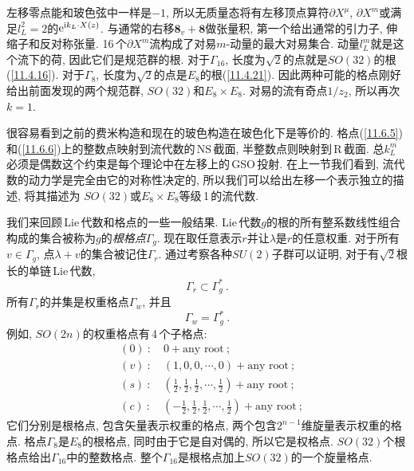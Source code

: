 左移零点能和玻色弦中一样是$ -1$, 所以无质量态将有左移顶点算符$ \partial X^{\mu}$, $\partial X^{m} $或满足$ l_{L}^{2}=2 $的$ \mathrm{e}^{\mathrm{i} k_{L}\cdot X(z)}$.  与通常的右移$ \mathbf{8}_{v}+\mathbf{8} $做张量积, 第一个给出通常的引力子, 伸缩子和反对称张量. 16\,个$\partial X^{m} $流构成了对易$ m $-动量的最大对易集合. 动量$ l_{L}^{m} $就是这个流下的荷, 因此它们是规范群的根. 对于$ \Gamma_{16}$, 长度为$ \sqrt{2} $的点就是$ SO(32) $的根(\ref{11.4.16}). 对于$ \Gamma_{8}$, 长度为$ \sqrt{2} $的点是$ E_{8} $的根(\ref{11.4.21}). 因此两种可能的格点刚好给出前面发现的两个规范群, $SO(32) $和$ E_{8}\times E_{8}$. 对易的流有奇点$ 1/z_{2}$, 所以再次$ k=1$.

很容易看到之前的费米构造和现在的玻色构造在玻色化下是等价的. 格点(\ref{11.6.5})和(\ref{11.6.6})上的整数点映射到流代数的\,NS\,截面, 半整数点则映射到\,R\,截面. 总$ k_{L}^{m} $必须是偶数这个约束是每个理论中在左移上的\,GSO\,投射. 在上一节我们看到, 流代数的动力学是完全由它的对称性决定的, 所以我们可以给出左移一个表示独立的描述, 将其描述为 $SO(32) $或$ E_{8}\times E_{8} $等级\,1\,的流代数.

我们来回顾\,Lie\,代数和格点的一些一般结果. Lie\,代数$ g $的根的所有整系数线性组合构成的集合被称为$ g $的{\emph{根格点}}$ \Gamma_{g}$. 现在取任意表示$ r $并让$ \lambda $是$ r $的任意权重. 对于所有$ v\in\Gamma_{g}$, 点$ \lambda+v $的集合被记住$ \Gamma_{r}$. 通过考察各种$ SU(2) $子群可以证明, 对于有$ \sqrt{2} $根长的单链\,Lie\,代数,
\begin{equation}
    \Gamma_{r} \subset \Gamma_{g}^{\ast} \:. \label{11.6.7}
\end{equation}
所有$ \Gamma_{r} $的并集是权重格点$ \Gamma_{w}$, 并且
\begin{equation}
    \Gamma_{w}=\Gamma_{g}^{\ast} \:.
\end{equation}
例如, $SO(2n) $的权重格点有\,4\,个子格点:
\begin{subequations}
\begin{align}
     &(0)\::\quad 0+\text{any root}\:; \label{11.6.9a} \\
     &(v)\::\quad (1,0,0,\cdots,0)+\text{any root}\:; \label{11.6.9b} \\
     &(s)\::\quad (\tfrac{1}{2},\tfrac{1}{2},\tfrac{1}{2},\cdots,\tfrac{1}{2})+\text{any root}\:; \label{11.6.9c} \\
     &(c)\::\quad (-\tfrac{1}{2},\tfrac{1}{2},\tfrac{1}{2},\cdots,\tfrac{1}{2})+\text{any root}\:; \label{11.6.9d} 
\end{align} \label{11.6.9}
\end{subequations}
它们分别是根格点, 包含矢量表示权重的格点, 两个包含$ 2^{n-1} $维旋量表示权重的格点.  格点$ \Gamma_{8} $是$ E_{8} $的根格点, 同时由于它是自对偶的, 所以它是权格点. $SO(32) $个根格点给出$ \Gamma_{16} $中的整数格点. 整个$ \Gamma_{16} $是根格点加上$ SO(32) $的一个旋量格点.

